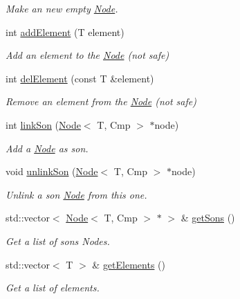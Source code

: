 \begin{DoxyCompactItemize}
\begin{DoxyCompactList}\small\item\em Make an new empty \hyperlink{classNode}{Node}. \item\end{DoxyCompactList}\item 
int \hyperlink{classNode_a00faa075c69d0e2015f7250d4e9c67c4}{addElement} (T element)
\begin{DoxyCompactList}\small\item\em Add an element to the \hyperlink{classNode}{Node} (not safe) \item\end{DoxyCompactList}\item 
int \hyperlink{classNode_aefc64b63487b63594388d386e5514ed0}{delElement} (const T \&element)
\begin{DoxyCompactList}\small\item\em Remove an element from the \hyperlink{classNode}{Node} (not safe) \item\end{DoxyCompactList}\item 
int \hyperlink{classNode_aebfe08afe47dc5a203d29c397378917c}{linkSon} (\hyperlink{classNode}{Node}$<$ T, Cmp $>$ $\ast$node)
\begin{DoxyCompactList}\small\item\em Add a \hyperlink{classNode}{Node} as son. \item\end{DoxyCompactList}\item 
void \hyperlink{classNode_a18a9441d84db7fc437c6105fcbeb7377}{unlinkSon} (\hyperlink{classNode}{Node}$<$ T, Cmp $>$ $\ast$node)
\begin{DoxyCompactList}\small\item\em Unlink a son \hyperlink{classNode}{Node} from this one. \item\end{DoxyCompactList}\item 
std::vector$<$ \hyperlink{classNode}{Node}$<$ T, Cmp $>$ $\ast$ $>$ \& \hyperlink{classNode_abe2b4ea866dac2c097420f41d0dc5b71}{getSons} ()
\begin{DoxyCompactList}\small\item\em Get a list of sons Nodes. \item\end{DoxyCompactList}\item 
std::vector$<$ T $>$ \& \hyperlink{classNode_ac9c04e56245dd777bfe3f677ac185beb}{getElements} ()
\begin{DoxyCompactList}\small\item\em Get a list of elements. \item\end{DoxyCompactList}\item 

\end{DoxyCompactItemize}
